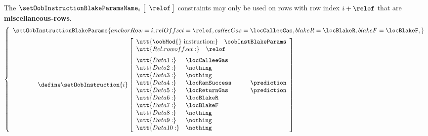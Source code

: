 \saNote{} The $\setOobInstructionBlakeParamsName _{i} \big[ \, \relof \, \big]$ constraints may only be used on rows with row index $i + \relof$ that are \textbf{miscellaneous-rows}.
\[
        \left\{ \begin{array}{l}
                \setOobInstructionBlakeParams {
                        anchorRow   = i           ,
                        relOffset   = \relof      ,
                        calleeGas   = \locCalleeGas ,
                        blakeR      = \locBlakeR  ,
                        blakeF      = \locBlakeF  ,
                }
                \vspace{2mm} \\
                \qquad \qquad \define
                \setOobInstruction{i}
                \left[ \begin{array}{llr}
                        \multicolumn{3}{l}{$\utt{\oobMod{} instruction:} ~ \oobInstBlakeParams$}           \\
                        \multicolumn{3}{l}{\utt{Rel. row offset:}            \quad \relof}         \vspace{2mm} \\
			\utt{Data 1:}  & \locCalleeGas  \\
                        \utt{Data 2:}  & \nothing       \\
                        \utt{Data 3:}  & \nothing       \\
                        \utt{Data 4:}  & \locRamSuccess  & \prediction \\
                        \utt{Data 5:}  & \locReturnGas   & \prediction \\
                        \utt{Data 6:}  & \locBlakeR     \\
                        \utt{Data 7:}  & \locBlakeF     \\
                        \utt{Data 8:}  & \nothing       \\
                        \utt{Data 9:}  & \nothing       \\
                        \utt{Data 10:} & \nothing       \\
                \end{array} \right] \\
        \end{array} \right.
\]
